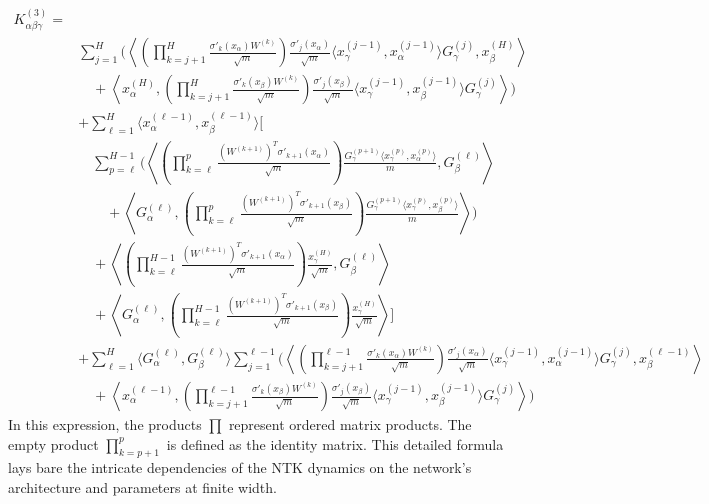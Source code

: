 \documentclass[a4paper]{article}
\begin{document}
\begin{align}
K^{(3)}_{\alpha\beta\gamma} = & \nonumber \\
& \sum_{j=1}^{H} \Biggl( \left\langle \left( \prod_{k=j+1}^{H} \frac{\sigma'_{k}(x_\alpha) W^{(k)}}{\sqrt{m}} \right) \frac{\sigma'_{j}(x_\alpha)}{\sqrt{m}} \langle x^{(j-1)}_\gamma, x^{(j-1)}_\alpha \rangle G^{(j)}_\gamma, x^{(H)}_\beta \right\rangle \nonumber \\
& \quad + \left\langle x^{(H)}_\alpha, \left( \prod_{k=j+1}^{H} \frac{\sigma'_{k}(x_\beta) W^{(k)}}{\sqrt{m}} \right) \frac{\sigma'_{j}(x_\beta)}{\sqrt{m}} \langle x^{(j-1)}_\gamma, x^{(j-1)}_\beta \rangle G^{(j)}_\gamma \right\rangle \Biggr) \nonumber \\
& + \sum_{\ell=1}^{H} \langle x^{(\ell-1)}_\alpha, x^{(\ell-1)}_\beta \rangle \Biggl[ \nonumber \\
& \quad \sum_{p=\ell}^{H-1} \Biggl( \left\langle \left( \prod_{k=\ell}^{p} \frac{(W^{(k+1)})^T \sigma'_{k+1}(x_\alpha)}{\sqrt{m}} \right) \frac{G^{(p+1)}_\gamma \langle x^{(p)}_\gamma, x^{(p)}_\alpha \rangle}{m}, G^{(\ell)}_\beta \right\rangle \nonumber \\
& \qquad + \left\langle G^{(\ell)}_\alpha, \left( \prod_{k=\ell}^{p} \frac{(W^{(k+1)})^T \sigma'_{k+1}(x_\beta)}{\sqrt{m}} \right) \frac{G^{(p+1)}_\gamma \langle x^{(p)}_\gamma, x^{(p)}_\beta \rangle}{m} \right\rangle \Biggr) \nonumber \\
& \quad + \left\langle \left( \prod_{k=\ell}^{H-1} \frac{(W^{(k+1)})^T \sigma'_{k+1}(x_\alpha)}{\sqrt{m}} \right) \frac{x^{(H)}_\gamma}{\sqrt{m}}, G^{(\ell)}_\beta \right\rangle \nonumber \\
& \quad + \left\langle G^{(\ell)}_\alpha, \left( \prod_{k=\ell}^{H-1} \frac{(W^{(k+1)})^T \sigma'_{k+1}(x_\beta)}{\sqrt{m}} \right) \frac{x^{(H)}_\gamma}{\sqrt{m}} \right\rangle \Biggr] \nonumber \\
& + \sum_{\ell=1}^{H} \langle G^{(\ell)}_\alpha, G^{(\ell)}_\beta \rangle \sum_{j=1}^{\ell-1} \Biggl( \left\langle \left( \prod_{k=j+1}^{\ell-1} \frac{\sigma'_{k}(x_\alpha) W^{(k)}}{\sqrt{m}} \right) \frac{\sigma'_{j}(x_\alpha)}{\sqrt{m}} \langle x^{(j-1)}_\gamma, x^{(j-1)}_\alpha \rangle G^{(j)}_\gamma, x^{(\ell-1)}_\beta \right\rangle \nonumber \\
& \quad + \left\langle x^{(\ell-1)}_\alpha, \left( \prod_{k=j+1}^{\ell-1} \frac{\sigma'_{k}(x_\beta) W^{(k)}}{\sqrt{m}} \right) \frac{\sigma'_{j}(x_\beta)}{\sqrt{m}} \langle x^{(j-1)}_\gamma, x^{(j-1)}_\beta \rangle G^{(j)}_\gamma \right\rangle \Biggr)
\end{align}
In this expression, the products $\prod$ represent ordered matrix products. The empty product $\prod_{k=p+1}^p$ is defined as the identity matrix. This detailed formula lays bare the intricate dependencies of the NTK dynamics on the network's architecture and parameters at finite width.
\end{document}
